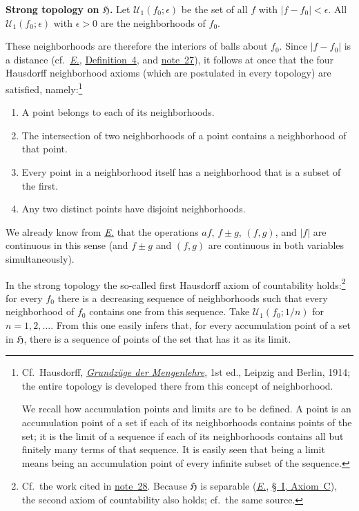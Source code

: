 \documentclass[
  paper=b5,
  twoside=true,
  fontsize=13pt,
  headings=normal,
  bookmarkpackage=false
]{scrartcl}
\theoremstyle{definition}
\newcommand{\NoteRef}[1]{\hyperref[fn:#1]{note~#1}}
\newcommand{\Eref}{\hyperref[fn:E-paper]{\emph{E.}}}
\newcommand{\ErefText}[1]{\href{https://doi.org/10.1007/BF01782338}{#1}}
\begin{document}
\medskip
\noindent\textbf{Strong topology on $\mathfrak H$.}
Let $\mathcal U_1(f_0;\epsilon)$ be the set of all $f$ with $|f-f_0|<\epsilon$.
All $\mathcal U_1(f_0;\epsilon)$ with $\epsilon>0$ are the neighborhoods of $f_0$.

These neighborhoods are therefore the interiors of balls about $f_0$. Since
$|f-f_0|$ is a distance (cf.\ \Eref, \ErefText{Definition~4}, and \NoteRef{27}), it follows at
once that the four Hausdorff neighborhood axioms (which are postulated in
every topology) are satisfied, namely:\footnote{\label{fn:28}Cf.\ Hausdorff,
\href{https://archive.org/details/grundzgedermen00hausuoft}{\emph{Grundz\"uge der Mengenlehre}}, 1st ed., Leipzig and Berlin, 1914; the
entire topology is developed there from this concept of neighborhood.

We recall how accumulation points and limits are to be defined. A point is
an accumulation point of a set if each of its neighborhoods contains points
of the set; it is the limit of a sequence if each of its neighborhoods
contains all but finitely many terms of that sequence. It is easily seen
that being a limit means being an accumulation point of every infinite
subset of the sequence.}
\begin{enumerate}
  \item[$\alpha)$] A point belongs to each of its neighborhoods.
  \item[$\beta)$] The intersection of two neighborhoods of a point contains
  a neighborhood of that point.
  \item[$\gamma)$] Every point in a neighborhood itself has a neighborhood
  that is a subset of the first.
  \item[$\delta)$] Any two distinct points have disjoint neighborhoods.
\end{enumerate}

We already know from \Eref{} that the operations $af$, $f\pm g$, $(f,g)$,
and $|f|$ are continuous in this sense (and $f\pm g$ and $(f,g)$ are
continuous in both variables simultaneously).

In the strong topology the so-called first Hausdorff axiom of countability
holds:\footnote{\label{fn:29}Cf.\ the work cited in \NoteRef{28}. Because $\mathfrak H$ is
separable (\Eref, \ErefText{\S~I, Axiom~C}), the second axiom of countability also holds;
cf.\ the same source.} for every $f_0$ there is a decreasing sequence of
neighborhoods such that every neighborhood of $f_0$ contains one from this
sequence. Take $\mathcal U_1(f_0;1/n)$ for $n=1,2,\ldots$.
From this one easily infers that, for every accumulation point of a set in
$\mathfrak H$, there is a sequence of points of the set that has it as its
limit.
\end{document}
